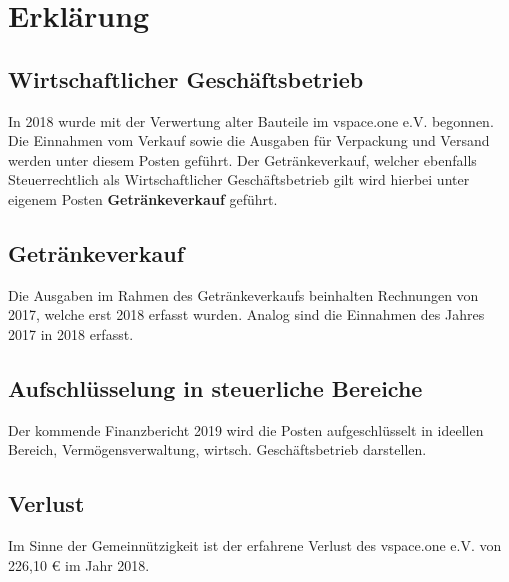 \documentclass{scrartcl}%
\begin{document}
\section{Erklärung}
\subsection{Wirtschaftlicher Geschäftsbetrieb}
In 2018 wurde mit der Verwertung alter Bauteile im vspace.one e.V. begonnen.
Die Einnahmen vom Verkauf sowie die Ausgaben für Verpackung und Versand werden unter diesem Posten
geführt.
Der Getränkeverkauf, welcher ebenfalls Steuerrechtlich als Wirtschaftlicher Geschäftsbetrieb gilt 
wird hierbei unter eigenem Posten \textbf{Getränkeverkauf} geführt.

\subsection{Getränkeverkauf}
Die Ausgaben im Rahmen des Getränkeverkaufs beinhalten Rechnungen von 2017, welche erst 2018 erfasst wurden.
Analog sind die Einnahmen des Jahres 2017 in 2018 erfasst.

\subsection{Aufschlüsselung in steuerliche Bereiche}
Der kommende Finanzbericht 2019 wird die Posten aufgeschlüsselt in ideellen Bereich, Vermögensverwaltung, 
wirtsch. Geschäftsbetrieb darstellen.

\subsection{Verlust}
Im Sinne der Gemeinnützigkeit ist der erfahrene Verlust des vspace.one e.V. von 226,10 € im Jahr 2018.
\end{document}
